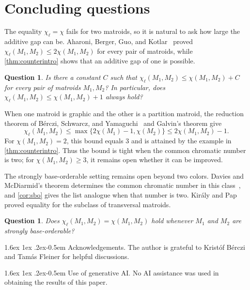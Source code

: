 \documentclass{article}
\makeatletter
\renewcommand{\paragraph}{%
  \@startsection{paragraph}{4}%
  {\z@}{1.6ex \@plus 1ex \@minus .2ex}{-0.5em}%
  {\normalfont\normalsize\bfseries}%
}
\theoremstyle{plain}
\newtheorem{qu}[thm]{Question}
\theoremstyle{definition}
\makeatother
\begin{document}
\section{Concluding questions}
\label{sec:open}

The equality $\chi_\ell=\chi$ fails for two matroids, so it is natural to ask how large the additive gap can be. Aharoni, Berger, Guo, and Kotlar~\cite{aharoni2025coloring} proved $\chi_\ell(M_1,M_2)\le2\chi(M_1,M_2)$ for every pair of matroids, while \cref{thm:counterintro} shows that an additive gap of one is possible.

\begin{qu}\label{qu:gap}
Is there a constant $C$ such that $\chi_\ell(M_1,M_2)\le \chi(M_1,M_2)+C$ for every pair of matroids $M_1,M_2$? In particular, does $\chi_\ell(M_1,M_2)\le \chi(M_1,M_2)+1$ always hold?
\end{qu}

When one matroid is graphic and the other is a partition matroid, the reduction theorem of B\'erczi, Schwarcz, and Yamaguchi~\cite[Theorem~1.6]{berczi2021list} and Galvin's theorem give
\[
\chi_\ell(M_1,M_2)\le \max\{2\chi(M_1)-1,\chi(M_2)\}\le2\chi(M_1,M_2)-1.
\]
For $\chi(M_1,M_2)=2$, this bound equals $3$ and is attained by the example in \cref{thm:counterintro}. Thus the bound is tight when the common chromatic number is two; for $\chi(M_1,M_2)\ge3$, it remains open whether it can be improved.

The strongly base-orderable setting remains open beyond two colors. Davies and McDiarmid's theorem determines the common chromatic number in this class~\cite{davies1976disjoint}, and \cref{cor:sbo} gives the list analogue when that number is two. Kir\'aly and Pap~\cite{kiraly2010list} proved equality for the subclass of transversal matroids.

\begin{qu}\label{qu:sbo}
Does $\chi_\ell(M_1,M_2)=\chi(M_1,M_2)$ hold whenever $M_1$ and $M_2$ are strongly base-orderable?
\end{qu}

\bigskip

\paragraph{Acknowledgements.}
The author is grateful to Kristóf Bérczi and Tamás Fleiner for helpful discussions.

\paragraph{Use of generative AI.}
No AI assistance was used in obtaining the results of this paper.



\end{document}
